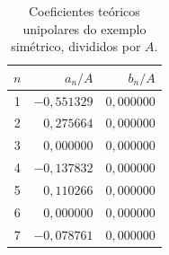 \begin{table}[H]
\centering
\footnotesize\setlength{\tabcolsep}{3.5pt}
\caption{Coeficientes teóricos unipolares do exemplo simétrico, divididos por $A$.}\label{tab:ret1}
\begin{tabular}{crr}\hline
$n$ & $a_n/A$ & $b_n/A$ \\ \hline
1 & $-0{,}551329$ & $0{,}000000$ \\
2 & $0{,}275664$ & $0{,}000000$ \\
3 & $0{,}000000$ & $0{,}000000$ \\
4 & $-0{,}137832$ & $0{,}000000$ \\
5 & $0{,}110266$ & $0{,}000000$ \\
6 & $0{,}000000$ & $0{,}000000$ \\
7 & $-0{,}078761$ & $0{,}000000$ \\
\hline\end{tabular}
\end{table}
